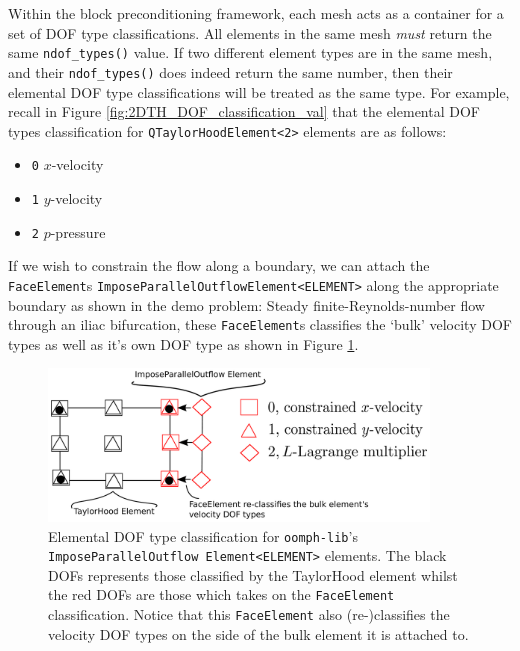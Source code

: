 Within the block preconditioning framework, each mesh acts as a container for 
a set of DOF type classifications. All elements in the same mesh \emph{must} 
return the same \texttt{ndof\_\allowbreak types()} value. If two different 
element types are in the same mesh, and their \texttt{ndof\_\allowbreak types()}
does indeed return the same number, then their elemental DOF type 
classifications will be treated as the same type. For example, recall in 
Figure \ref{fig:2DTH_DOF_classification_val} that the elemental DOF types 
classification for \texttt{Q\allowbreak TaylorHood\allowbreak Element<2>} 
elements are as follows:
\begin{itemize}
  \item \texttt{0} $x$-velocity
  \item \texttt{1} $y$-velocity
  \item \texttt{2} $p$-pressure
\end{itemize}
If we wish to constrain the flow along a boundary, we can attach the 
\texttt{Face\allowbreak Element}s 
\texttt{Impose\allowbreak Parallel\allowbreak Outflow\allowbreak Element<ELEMENT>} 
along the appropriate boundary as shown in the demo problem: Steady 
finite-Reynolds-number flow through an iliac bifurcation, these 
\texttt{Face\allowbreak Element}s classifies the `bulk' velocity DOF types 
as well as it's own DOF type as shown in Figure 
\ref{fig:2DFACE_DOF_classification_val}.
\begin{figure}[H]
\centering
\includegraphics[width=0.9\textwidth]{./pic/faceelemenet_dof_classification.pdf}
\caption{Elemental DOF type classification for \texttt{oomph-\allowbreak lib}'s
  \texttt{Impose\allowbreak Parallel\allowbreak Outflow\allowbreak
    Element<ELEMENT>} elements. The black DOFs represents those classified by
  the TaylorHood element whilst the red DOFs are those which takes on the
  \texttt{Face\allowbreak Element} classification. Notice that this
  \texttt{Face\allowbreak Element} also (re-)classifies the velocity DOF types
  on the side of the bulk element it is attached to.}
\label{fig:2DFACE_DOF_classification_val}
\end{figure}

